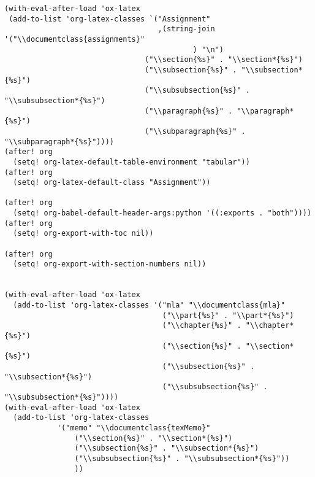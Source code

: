 \documentclass{assignments}
\begin{document}
\begin{verbatim}
(with-eval-after-load 'ox-latex
 (add-to-list 'org-latex-classes `("Assignment"
                                   ,(string-join '("\\documentclass{assignments}"
                                           ) "\n")
                                ("\\section{%s}" . "\\section*{%s}")
                                ("\\subsection{%s}" . "\\subsection*{%s}")
                                ("\\subsubsection{%s}" . "\\subsubsection*{%s}")
                                ("\\paragraph{%s}" . "\\paragraph*{%s}")
                                ("\\subparagraph{%s}" . "\\subparagraph*{%s}"))))
(after! org
  (setq! org-latex-default-table-environment "tabular"))
(after! org
  (setq! org-latex-default-class "Assignment"))

(after! org
  (setq! org-babel-default-header-args:python '((:exports . "both"))))
(after! org
  (setq! org-export-with-toc nil))

(after! org
  (setq! org-export-with-section-numbers nil))


(with-eval-after-load 'ox-latex
  (add-to-list 'org-latex-classes '("mla" "\\documentclass{mla}"
                                    ("\\part{%s}" . "\\part*{%s}")
                                    ("\\chapter{%s}" . "\\chapter*{%s}")
                                    ("\\section{%s}" . "\\section*{%s}")
                                    ("\\subsection{%s}" . "\\subsection*{%s}")
                                    ("\\subsubsection{%s}" . "\\subsubsection*{%s}"))))
(with-eval-after-load 'ox-latex
  (add-to-list 'org-latex-classes
            '("memo" "\\documentclass{texMemo}"
                ("\\section{%s}" . "\\section*{%s}")
                ("\\subsection{%s}" . "\\subsection*{%s}")
                ("\\subsubsection{%s}" . "\\subsubsection*{%s}"))
                ))
\end{verbatim}
\end{document}
